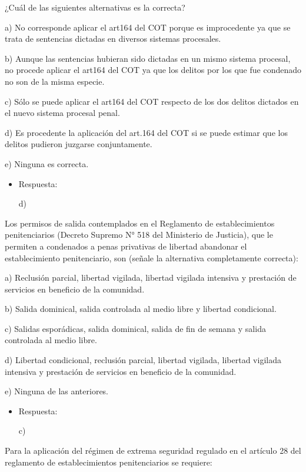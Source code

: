 \documentclass[letterpaper, 11pt]{article}
\begin{document}
¿Cuál de las siguientes alternativas es la correcta?

a) No corresponde aplicar el art164 del COT porque es improcedente ya
que se trata de sentencias dictadas en diversos sistemas procesales.

b) Aunque las sentencias hubieran sido dictadas en un mismo sistema
procesal, no procede aplicar el art164 del COT ya que los delitos por
los que fue condenado no son de la misma especie.

c) Sólo se puede aplicar el art164 del COT respecto de los dos delitos
dictados en el nuevo sistema procesal penal.

d) Es procedente la aplicación del art.164 del COT si se puede estimar
que los delitos pudieron juzgarse conjuntamente.

e) Ninguna es correcta.


\begin{itemize}
\item Respuesta:

d)
\end{itemize}


Los permisos de salida contemplados en el Reglamento de
establecimientos penitenciarios (Decreto Supremo N° 518 del Ministerio
de Justicia), que le permiten a condenados a penas privativas de
libertad abandonar el establecimiento penitenciario, son (señale la
alternativa completamente correcta):



a) Reclusión parcial, libertad vigilada, libertad vigilada intensiva y
prestación de servicios en beneficio de la comunidad.

b) Salida dominical, salida controlada al medio libre y libertad
condicional.


c) Salidas esporádicas, salida dominical, salida de fin de semana y
salida controlada al medio libre.

d) Libertad condicional, reclusión parcial, libertad vigilada,
libertad vigilada intensiva y prestación de servicios en beneficio de
la comunidad.

e) Ninguna de las anteriores.


\begin{itemize}
\item Respuesta:

c)
\end{itemize}


Para la aplicación del régimen de extrema seguridad regulado en el
artículo 28 del reglamento de establecimientos penitenciarios se
requiere:
\end{document}
